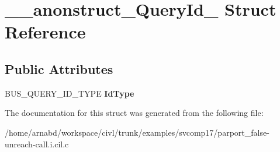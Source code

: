 \hypertarget{struct____anonstruct__QueryId__76}{}\section{\+\_\+\+\_\+anonstruct\+\_\+\+Query\+Id\+\_ Struct Reference}
\label{struct____anonstruct__QueryId__76}
\subsection*{Public Attributes}
\begin{DoxyCompactItemize}
\item 
\hypertarget{struct____anonstruct__QueryId__76_aa0fc995d00a88fbd1a5a05170c34847f}{}B\+U\+S\+\_\+\+Q\+U\+E\+R\+Y\+\_\+\+I\+D\+\_\+\+T\+Y\+P\+E {\bfseries Id\+Type}\label{struct____anonstruct__QueryId__76_aa0fc995d00a88fbd1a5a05170c34847f}

\end{DoxyCompactItemize}


The documentation for this struct was generated from the following file\+:\begin{DoxyCompactItemize}
\item 
/home/arnabd/workspace/civl/trunk/examples/svcomp17/parport\+\_\+false-\/unreach-\/call.\+i.\+cil.\+c\end{DoxyCompactItemize}
